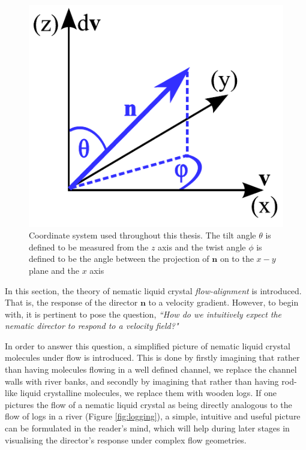 \begin{figure}
\begin{center}
\includegraphics{Figures/Theory/coords}
\end{center}
\caption[Coordinate system]{\label{fig:coords}Coordinate system used throughout this thesis. The tilt angle $\theta$ is defined to be measured from the $z$ axis and the twist angle $\phi$ is defined to be the angle between the projection of $\mathbf{n}$ on to the $x-y$ plane and the $x$ axis}
\end{figure}

In this section, the theory of nematic liquid crystal \textit{flow-alignment} is introduced. That is, the response of the director $\mathbf{n}$ to a velocity gradient. However, to begin with, it is pertinent to pose the question, \textit{``How do we intuitively expect the nematic director to respond to a velocity field?"}

In order to answer this question, a simplified picture of nematic liquid crystal molecules under flow is introduced. This is done by firstly imagining that rather than having molecules flowing in a well defined channel, we replace the channel walls with river banks, and secondly by imagining that rather than having rod-like liquid crystalline molecules, we replace them with wooden logs. If one pictures the flow of a nematic liquid crystal as being directly analogous to the flow of logs in a river (Figure \ref{fig:logging}), a simple, intuitive and useful picture can be formulated in the reader's mind, which will help during later stages in visualising the director's response under complex flow geometries.

